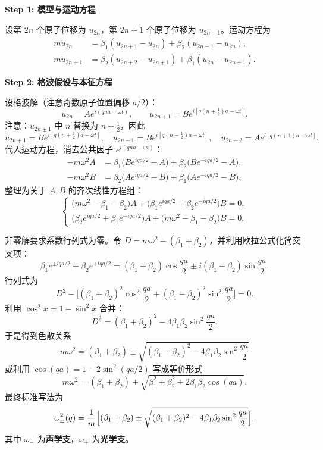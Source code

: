 \begin{derivationbox}[标准解题过程]
\textbf{Step 1: 模型与运动方程}

设第 $2n$ 个原子位移为 $u_{2n}$，第 $2n+1$ 个原子位移为 $u_{2n+1}$。运动方程为
\begin{align}
    m\ddot{u}_{2n} &= \beta_1(u_{2n+1}-u_{2n}) + \beta_2(u_{2n-1}-u_{2n}), \\
    m\ddot{u}_{2n+1} &= \beta_2(u_{2n+2}-u_{2n+1}) + \beta_1(u_{2n}-u_{2n+1}).
\end{align}

\textbf{Step 2: 格波假设与本征方程}

设格波解（注意奇数原子位置偏移 $a/2$）：
\[
u_{2n} = A e^{i(qna-\omega t)}, \qquad u_{2n+1} = B e^{i[q(n+\frac12)a-\omega t]}.
\]
注意：$u_{2n\pm1}$ 中 $n$ 替换为 $n\pm\frac12$，因此
\[
u_{2n+1} = B e^{i[q(n+\frac12)a-\omega t]}, \quad u_{2n-1} = B e^{i[q(n-\frac12)a-\omega t]}, \quad u_{2n+2} = A e^{i[q(n+1)a-\omega t]}.
\]
代入运动方程，消去公共因子 $e^{i(qna-\omega t)}$：
\begin{align}
    -m\omega^2 A &= \beta_1\bigl(B e^{iqa/2} - A\bigr) + \beta_2\bigl(B e^{-iqa/2} - A\bigr), \\
    -m\omega^2 B &= \beta_2\bigl(A e^{iqa/2} - B\bigr) + \beta_1\bigl(A e^{-iqa/2} - B\bigr).
\end{align}
整理为关于 $A,B$ 的齐次线性方程组：
\begin{equation}
\begin{cases}
\displaystyle \bigl(m\omega^2 - \beta_1 - \beta_2\bigr)A + \bigl(\beta_1 e^{iqa/2} + \beta_2 e^{-iqa/2}\bigr)B = 0, \\[8pt]
\displaystyle \bigl(\beta_2 e^{iqa/2} + \beta_1 e^{-iqa/2}\bigr)A + \bigl(m\omega^2 - \beta_1 - \beta_2\bigr)B = 0.
\end{cases}
\label{eq:AB-system}
\end{equation}

非零解要求系数行列式为零。令 $D = m\omega^2 - (\beta_1+\beta_2)$，并利用欧拉公式化简交叉项：
\[
\beta_1 e^{\pm iqa/2} + \beta_2 e^{\mp iqa/2} = (\beta_1+\beta_2)\cos\frac{qa}{2} \pm i(\beta_1-\beta_2)\sin\frac{qa}{2}.
\]
行列式为
\[
D^2 - \bigl[(\beta_1+\beta_2)^2\cos^2\frac{qa}{2} + (\beta_1-\beta_2)^2\sin^2\frac{qa}{2}\bigr] = 0.
\]
利用 $\cos^2x=1-\sin^2x$ 合并：
\[
D^2 = (\beta_1+\beta_2)^2 - 4\beta_1\beta_2\sin^2\frac{qa}{2}.
\]
于是得到色散关系
\begin{equation}
\boxed{m\omega^2 = (\beta_1+\beta_2) \pm \sqrt{(\beta_1+\beta_2)^2 - 4\beta_1\beta_2\sin^2\frac{qa}{2}}}
\end{equation}
或利用 $\cos(qa)=1-2\sin^2(qa/2)$ 写成等价形式
\begin{equation}
m\omega^2 = (\beta_1+\beta_2) \pm \sqrt{\beta_1^2+\beta_2^2+2\beta_1\beta_2\cos(qa)}.
\end{equation}
最终标准写法为
\begin{equation}
\omega_{\pm}^2(q) = \frac{1}{m}\Bigl[(\beta_1+\beta_2) \pm \sqrt{(\beta_1+\beta_2)^2 - 4\beta_1\beta_2\sin^2\frac{qa}{2}}\Bigr].
\label{eq:diatomic-dispersion}
\end{equation}
其中 $\omega_-$ 为\textbf{声学支}，$\omega_+$ 为\textbf{光学支}。


\end{derivationbox}
